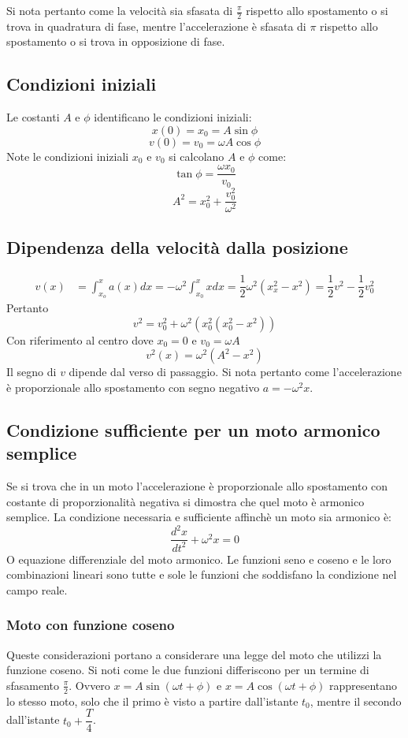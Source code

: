 \documentclass[class=book, crop=false, oneside, 12pt]{standalone}
\begin{document}
	Si nota pertanto come la velocit\`a sia sfasata di $\frac{\pi}{2}$  rispetto allo spostamento o si trova in quadratura di fase, mentre l'accelerazione \`e sfasata di $\pi$ rispetto allo spostamento o si trova in opposizione di fase.
	\subsection{Condizioni iniziali}
	Le costanti $A$ e $\phi$ identificano le condizioni iniziali:
	$$ x(0) = x_0 = A \sin\phi$$
	$$v(0) = v_0 = \omega A \cos\phi$$
	Note le condizioni iniziali $x_0$ e $v_0$ si calcolano $A$ e $\phi$ come:
	$$\tan \phi = \dfrac{\omega x_0}{v_0}$$
	$$A^2 = x_0^2 + \dfrac{v_0^2}{\omega^2}$$
	\subsection{Dipendenza della velocit\`a dalla posizione}
	\begin{align*}
		v(x) &= \int_{x_o}^x a(x)dx=-\omega^2\int_{x_0}^x xdx=\dfrac{1}{2}\omega^2(x_x^2-x^2)=\dfrac{1}{2}v^2 - \dfrac{1}{2}v_0^2
	\end{align*}
	Pertanto
	$$v^2 = v_0^2 + \omega^2(x_0^2(x_0^2-x^2))$$
	Con riferimento al centro dove $x_0 = 0$ e $v_0 = \omega A$
	$$v^2(x)=\omega^2(A^2 - x^2)$$
	Il segno di $v$ dipende dal verso di passaggio.
	Si nota pertanto come l'accelerazione \`e proporzionale allo spostamento con segno negativo $a =-\omega^2 x$.
	\subsection{Condizione sufficiente per un moto armonico semplice}
	Se si trova che in un moto l'accelerazione \`e proporzionale allo spostamento con costante di proporzionalit\`a negativa si dimostra che quel moto \`e armonico semplice.
	La condizione necessaria e sufficiente affinch\`e un moto sia armonico \`e:
	$$\dfrac{d^2x}{dt^2}+\omega^2x=0$$
	O equazione differenziale del moto armonico.
	Le funzioni seno e coseno e le loro combinazioni lineari sono tutte e sole le funzioni che soddisfano la condizione nel campo reale.
		\subsubsection{Moto con funzione coseno}
		Queste considerazioni portano a considerare una legge del moto che utilizzi la funzione coseno.
		Si noti come le due funzioni differiscono per un termine di sfasamento $\frac{\pi}{2}$.
		Ovvero $x=A\sin(\omega t+\phi)$ e $x = A\cos(\omega t+\phi)$ rappresentano lo stesso moto, solo che il primo \`e visto a partire dall'istante $t_0$, mentre il secondo dall'istante $t_0 + \dfrac{T}{4}$.
\end{document}
